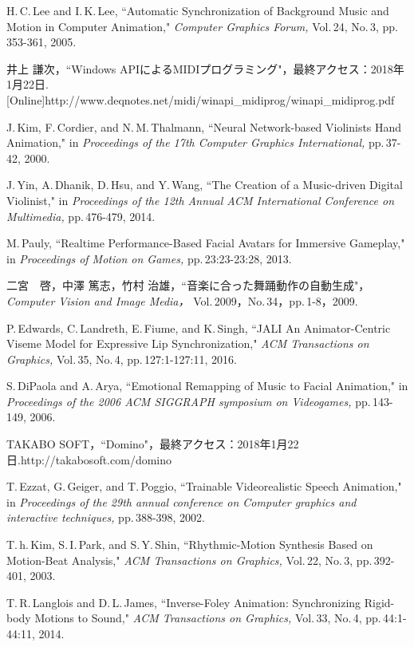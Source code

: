 \begin{thebibliography}{55}
H.\,C.\,Lee and I.\,K.\,Lee,
 ``Automatic Synchronization of Background Music and Motion in Computer Animation,"
 \textit{Computer Graphics Forum,} Vol.\,24, No.\,3, pp.\,353-361, 2005.

井上 謙次，``Windows APIによるMIDIプログラミング"，最終アクセス：2018年1月22日.\,
[Online]http://www.deqnotes.net/midi/winapi\_midiprog/winapi\_midiprog.pdf

J.\,Kim, F.\,Cordier, and N.\,M.\,Thalmann,
 ``Neural Network-based Violinists Hand Animation,"
 in \textit{Proceedings of the 17th Computer Graphics International,} pp.\,37-42, 2000.

J.\,Yin, A.\,Dhanik, D.\,Hsu, and Y.\,Wang,
 ``The Creation of a Music-driven Digital Violinist,"
 in \textit{Proceedings of the 12th Annual ACM International Conference on Multimedia,} pp.\,476-479, 2014.
 
M.\,Pauly,
 ``Realtime Performance-Based Facial Avatars for Immersive Gameplay," in \textit{Proceedings of Motion on Games,} pp.\,23:23-23:28, 2013.

二宮　啓，中澤 篤志，竹村 治雄，``音楽に合った舞踊動作の自動生成"，
\textit{Computer Vision and Image Media，} Vol.\,2009，No.\,34，pp.\,1-8，2009.
 
P.\,Edwards, C.\,Landreth, E.\,Fiume, and K.\,Singh,
 ``JALI An Animator-Centric Viseme Model for Expressive Lip Synchronization,"
 \textit{ACM Transactions on Graphics,} Vol.\,35, No.\,4, pp.\,127:1-127:11, 2016.

S.\,DiPaola and A.\,Arya,
 ``Emotional Remapping of Music to Facial Animation,"
 in \textit{Proceedings of the 2006 ACM SIGGRAPH symposium on Videogames,} pp.\,143-149, 2006.
  
TAKABO SOFT，``Domino"，最終アクセス：2018年1月22日.\newline
[Online]http://takabosoft.com/domino

T.\,Ezzat, G.\,Geiger, and T.\,Poggio,
 ``Trainable Videorealistic Speech Animation,"
 in \textit{Proceedings of the 29th annual conference on Computer graphics and interactive techniques,} pp.\,388-398, 2002.

T.\,h.\,Kim, S.\,I.\,Park, and S.\,Y.\,Shin,
 ``Rhythmic-Motion Synthesis Based on Motion-Beat Analysis,"
\textit{ACM Transactions on Graphics,} Vol.\,22, No.\,3, pp.\,392-401, 2003.

T.\,R.\,Langlois and D.\,L.\,James,
 ``Inverse-Foley Animation: Synchronizing Rigid-body Motions to Sound,"
 \textit{ACM Transactions on Graphics,} Vol.\,33, No.\,4, pp.\,44:1-44:11, 2014.


\end{thebibliography}
